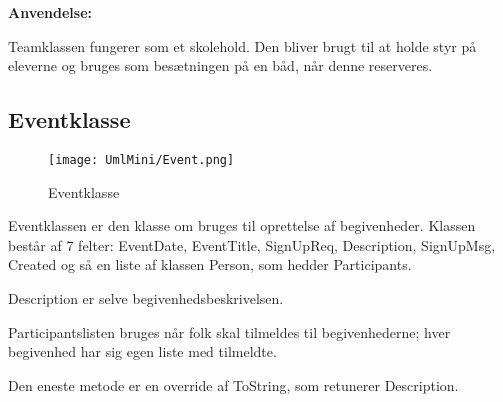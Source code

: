 \textbf{Anvendelse:}

Teamklassen fungerer som et skolehold. Den bliver brugt til at holde styr på eleverne og bruges som besætningen på en båd, når denne reserveres. 

 
\subsection{Eventklasse}

\begin{wrapfigure}{l}{0.5\textwidth}
    \label{img:login_interface}
    \vspace{-20pt}
    \begin{center}
        \texttt{[image: UmlMini/Event.png]}
    \end{center}
    \vspace{-20pt}
    \caption{Eventklasse}
    \vspace{-10pt}
\end{wrapfigure}
Eventklassen er den klasse om bruges til oprettelse af  begivenheder. Klassen består af 7 felter: EventDate, EventTitle, SignUpReq, Description, SignUpMsg, Created og så en liste af klassen Person, som hedder Participants.

Description er selve begivenhedsbeskrivelsen. 

Participantslisten bruges når folk skal tilmeldes til begivenhederne; hver begivenhed har sig egen liste med tilmeldte. 

Den eneste metode er en override af ToString, som retunerer Description.

